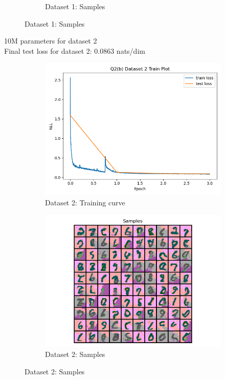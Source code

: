 \documentclass{article}
\begin{document}
\begin{enumerate}[(a)]
\begin{figure}[H]
\begin{subfigure}{0.45\textwidth}
        \caption{Dataset 1: Samples}
    \end{subfigure}
\end{figure}
10M parameters for dataset 2 \\
Final test loss for dataset 2: 0.0863 nats/dim
\begin{figure}[H]
    \centering
    \begin{subfigure}{0.45\textwidth}
        \centering
        \includegraphics[width=\textwidth]{figures/q2_b_dset2_train_plot.png}
        \caption{Dataset 2: Training curve}
    \end{subfigure}
    \hspace{0.2in}
    \begin{subfigure}{0.45\textwidth}
        \centering
        \includegraphics[width=\textwidth]{figures/q2_b_dset2_samples.png}
        \caption{Dataset 2: Samples}
    \end{subfigure}
\end{figure}
\end{enumerate}
\end{document}
